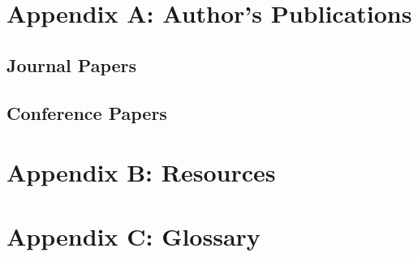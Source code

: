 
\chapter{Appendix A: Author's Publications}


\section*{Journal Papers}

\section*{Conference Papers}


\chapter{Appendix B: Resources}

\chapter{Appendix C: Glossary}

